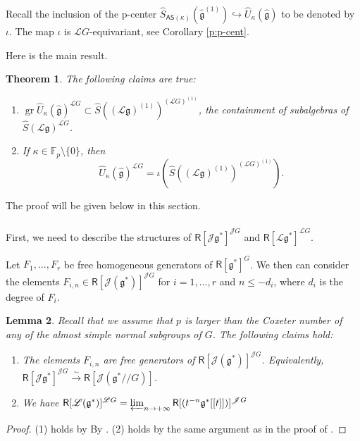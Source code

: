 \documentclass{amsart}
\newtheorem{Thm}{Theorem}[subsection]
\newtheorem{Lem}[Thm]{Lemma}
\theoremstyle{definition}
\newcommand{\sss}{\subsubsection{}}
\newcommand{\Ring}{\mathsf{R}}
\newcommand{\g}{\mathfrak{g}}
\newcommand{\hg}{\hat{\mathfrak{g}}}
\newcommand{\gr}{\operatorname{gr}}
\newcommand{\F}{\mathbb{F}}
\newcommand{\Jet}{\mathscr{J}}
\newcommand{\Loop}{\mathscr{L}}
\newcommand{\AS}{\mathsf{AS}}
\numberwithin{equation}{section}
\begin{document}
Recall the inclusion of the p-center $ \widehat{S}_{\AS(\kappa)}(\hg^{(1)})\hookrightarrow \widehat{U}_\kappa(\hat{\g})$ to be denoted by $\iota$. The map $\iota$ is $\Loop G$-equivariant, see Corollary \ref{p:p-cent}. 

Here is the main result. 

\begin{Thm}\label{Thm:integral_case}
The following claims are true:
\begin{enumerate}
\item $\gr \widehat{U}_\kappa(\hg)^{\Loop G}\subset  \widehat{S}\left((\Loop \g)^{(1)}\right)^{(\Loop G)^{(1)}}$, the containment of subalgebras of $\widehat{S}(\Loop \g)^{\Loop G}$.
\item If $\kappa\in \F_p\setminus \{0\}$, then
$$\widehat{U}_\kappa(\hg)^{\Loop G}=\iota\left(\widehat{S}\left((\Loop \g)^{(1)}\right)^{(\Loop G)^{(1)}}\right).$$
\end{enumerate}
\end{Thm}

The proof will be given below in this section.

\sss First, we need to describe the structures of $\Ring[\Jet \g^*]^{\Jet G}$
and $\Ring[\Loop \g^*]^{\Loop G}$.

Let $F_1,\ldots,F_r$ be free homogeneous generators of 
$\Ring[\g^*]^G$. We then can consider the elements $F_{i,n}\in \Ring[\Jet(\g^*)]^{\Jet G}$ for $i=1,\ldots,r$ and $n\leqslant -d_i$, where $d_i$ is the degree of $F_i$.

\begin{Lem}\label{Lem:Jet_Loop_invariants}
Recall that we assume that $p$ is larger than the Coxeter number of any of the almost simple normal subgroups of $G$.
The following claims hold:
\begin{enumerate}
\item The elements $F_{i,n}$ are free generators of $\Ring[\Jet(\g^*)]^{\Jet G}$.
Equivalently, $\Ring[\Jet\g^*]^{\Jet G}\xrightarrow{\sim}\Ring[\Jet(\g^*/\!/G)]$.
\item We have $\Ring[\Loop(\g^*)]^{\Loop G}=\varprojlim_{n\rightarrow +\infty}\Ring[(t^{-n}\g^*[[t]])]^{\Jet G}$
\end{enumerate}
\end{Lem}
\begin{proof}
(1) holds by By \cite[Theorem 4.4]{ATV}. (2) holds by the same argument as in the proof of 
\cite[Proposition 4.3.4]{Frenkel_loop}.
\end{proof}
\end{document}
